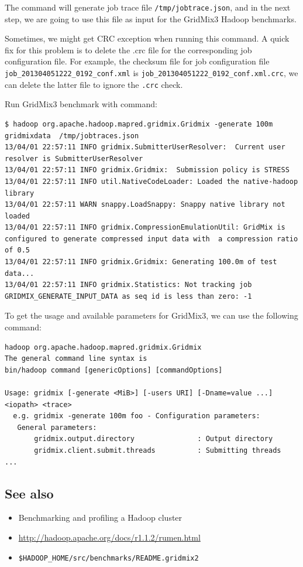 The command will generate job trace file \verb|/tmp/jobtrace.json|, and in the next step, we are going to use this file as input for the GridMix3 Hadoop benchmarks.

Sometimes, we might get CRC exception when running this command. A quick fix for this problem is to delete the .crc file for the corresponding job configuration file.  For example, the checksum file for job configuration file \verb|job_201304051222_0192_conf.xml| is \verb|job_201304051222_0192_conf.xml.crc|, we can delete the latter file to ignore the \verb|.crc| check.

Run GridMix3 benchmark with command:
\lstset{style=bashstyle}
\begin{lstlisting}
$ hadoop org.apache.hadoop.mapred.gridmix.Gridmix -generate 100m gridmixdata  /tmp/jobtraces.json
13/04/01 22:57:11 INFO gridmix.SubmitterUserResolver:  Current user resolver is SubmitterUserResolver
13/04/01 22:57:11 INFO gridmix.Gridmix:  Submission policy is STRESS
13/04/01 22:57:11 INFO util.NativeCodeLoader: Loaded the native-hadoop library
13/04/01 22:57:11 WARN snappy.LoadSnappy: Snappy native library not loaded
13/04/01 22:57:11 INFO gridmix.CompressionEmulationUtil: GridMix is configured to generate compressed input data with  a compression ratio of 0.5
13/04/01 22:57:11 INFO gridmix.Gridmix: Generating 100.0m of test data...
13/04/01 22:57:11 INFO gridmix.Statistics: Not tracking job GRIDMIX_GENERATE_INPUT_DATA as seq id is less than zero: -1
\end{lstlisting}

To get the usage and available parameters for GridMix3, we can use the following command:
\lstset{style=bashstyle}
\begin{lstlisting}
hadoop org.apache.hadoop.mapred.gridmix.Gridmix
The general command line syntax is
bin/hadoop command [genericOptions] [commandOptions]

Usage: gridmix [-generate <MiB>] [-users URI] [-Dname=value ...] <iopath> <trace>
  e.g. gridmix -generate 100m foo - Configuration parameters:
   General parameters:
       gridmix.output.directory               : Output directory
       gridmix.client.submit.threads          : Submitting threads
...
\end{lstlisting}
\subsection*{See also}
\begin{itemize}
  \item Benchmarking and profiling a Hadoop cluster
  \item \url{http://hadoop.apache.org/docs/r1.1.2/rumen.html}
  \item \verb|$HADOOP_HOME/src/benchmarks/README.gridmix2|
\end{itemize}

